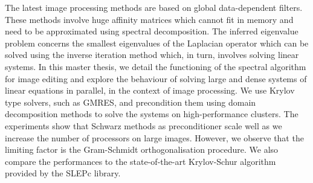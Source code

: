 The latest image processing methods are based on global data-dependent filters.
These methods involve huge affinity matrices which cannot fit in memory and need to be approximated using spectral decomposition.
The inferred eigenvalue problem concerns the smallest eigenvalues of the Laplacian operator which can be solved using the inverse iteration method which, in turn, involves solving linear systems.
In this master thesis, we detail the functioning of the spectral algorithm for image editing and explore the behaviour of solving large and dense systems of linear equations in parallel, in the context of image processing.
We use Krylov type solvers, such as GMRES, and precondition them using domain decomposition methods to solve the systems on high-performance clusters.
The experiments show that Schwarz methods as preconditioner scale well as we increase the number of processors on large images.
However, we observe that the limiting factor is the Gram-Schmidt orthogonalisation procedure.
\ifthesis
 We also compare the performances to the state-of-the-art Krylov-Schur algorithm provided by the SLEPc library.
\fi
